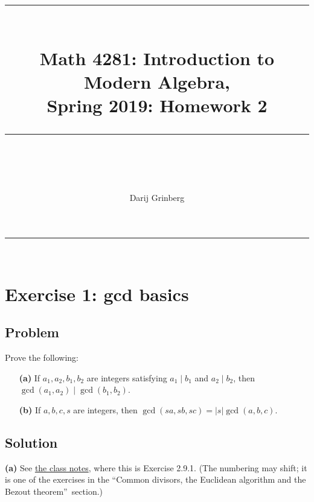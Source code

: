 \documentclass[paper=a4, fontsize=12pt]{scrartcl}%
\theoremstyle{plainsl}
\theoremstyle{definition}
\theoremstyle{remark}
\begin{document}
\title{ \\[25pt] \rule{\linewidth}{0.5pt} \\[0.4cm] {\huge Math 4281: Introduction to Modern Algebra, }\\Spring 2019: Homework 2\\\rule{\linewidth}{2pt} \\[0.5cm] }
\author{Darij Grinberg}
\maketitle

\rule{\linewidth}{0.3pt} \\[0.4cm]

\section{Exercise 1: gcd basics}

\subsection{Problem}

Prove the following:

\begin{enumerate}
\item[\textbf{(a)}] If $a_{1}, a_{2}, b_{1}, b_{2}$ are integers satisfying
$a_{1} \mid b_{1}$ and $a_{2} \mid b_{2}$, then $\gcd\left(  a_{1}, a_{2}
\right)  \mid\gcd\left(  b_{1}, b_{2} \right)  $.

\item[\textbf{(b)}] If $a, b, c, s$ are integers, then $\gcd\left(  sa, sb, sc
\right)  = \left|  s \right|  \gcd\left(  a, b, c \right)  $.
\end{enumerate}

\subsection{Solution}

\textbf{(a)} See
\href{http://www-users.math.umn.edu/~dgrinber/19s/notes.pdf}{the class notes},
where this is Exercise 2.9.1. (The numbering may shift; it is one of the
exercises in the \textquotedblleft Common divisors, the Euclidean algorithm
and the Bezout theorem\textquotedblright\ section.)
\end{document}
